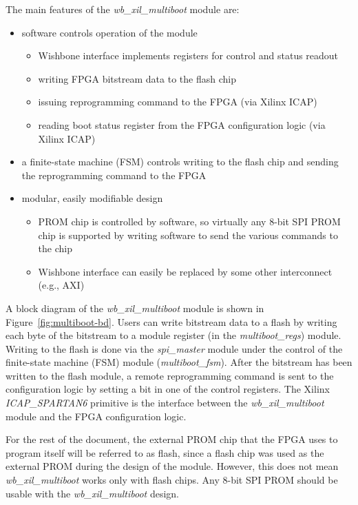 \documentclass[a4paper,11pt]{article}
\begin{document}
The main features of the \textit{wb\_xil\_multiboot} module are:
\begin{itemize}
  \item software controls operation of the module
  \begin{itemize}
    \item Wishbone interface implements registers for control and status readout
    \item writing FPGA bitstream data to the flash chip
    \item issuing reprogramming command to the FPGA (via Xilinx ICAP)
    \item reading boot status register from the FPGA configuration logic (via Xilinx ICAP)
  \end{itemize}
  \item a finite-state machine (FSM) controls writing to the flash chip and sending the
  reprogramming command to the FPGA
  \item modular, easily modifiable design
  \begin{itemize}
    \item PROM chip is controlled by software, so virtually any 8-bit SPI PROM chip is
    supported by writing software to send the various commands to the chip
    \item Wishbone interface can easily be replaced by some other interconnect (e.g., AXI)
  \end{itemize}
\end{itemize}

A block diagram of the \textit{wb\_xil\_multiboot} module is shown in Figure~\ref{fig:multiboot-bd}.
Users can write bitstream data to a flash by writing each byte of the bitstream to a module register
(in the \textit{multiboot\_regs}) module. Writing to the flash is done via the \textit{spi\_master}
module under the control of the finite-state machine (FSM) module (\textit{multiboot\_fsm}). After the
bitstream has been written to the flash module, a remote reprogramming command is sent
to the configuration logic by setting a bit in one of the control registers. The
Xilinx \textit{ICAP\_SPARTAN6} primitive is the interface between the \textit{wb\_xil\_multiboot}
module and the FPGA configuration logic.

For the rest of the document, the external PROM chip that the FPGA uses to
program itself will be referred to as flash, since a flash chip was used
as the external PROM during the design of the module. However, this does not
mean \textit{wb\_xil\_multiboot} works only with flash chips. Any 8-bit SPI PROM
should be usable with the \textit{wb\_xil\_multiboot} design.
\end{document}
